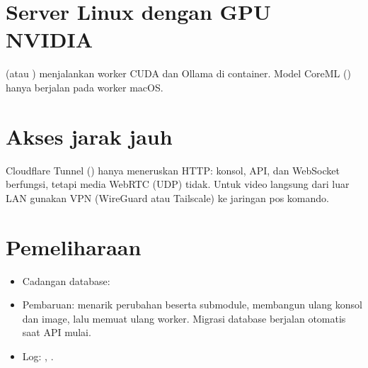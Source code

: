 \section{Server Linux dengan GPU NVIDIA}
 (atau ) menjalankan worker CUDA dan Ollama di container. Model CoreML () hanya berjalan pada worker macOS.

\section{Akses jarak jauh}
\begin{catatan}
Cloudflare Tunnel () hanya meneruskan HTTP: konsol, API, dan WebSocket berfungsi, tetapi media WebRTC (UDP) tidak. Untuk video langsung dari luar LAN gunakan VPN (WireGuard atau Tailscale) ke jaringan pos komando.
\end{catatan}

\section{Pemeliharaan}
\begin{itemize}
\item Cadangan database: 
\item Pembaruan:  menarik perubahan beserta submodule, membangun ulang konsol dan image, lalu memuat ulang worker. Migrasi database berjalan otomatis saat API mulai.
\item Log: , .
\end{itemize}
